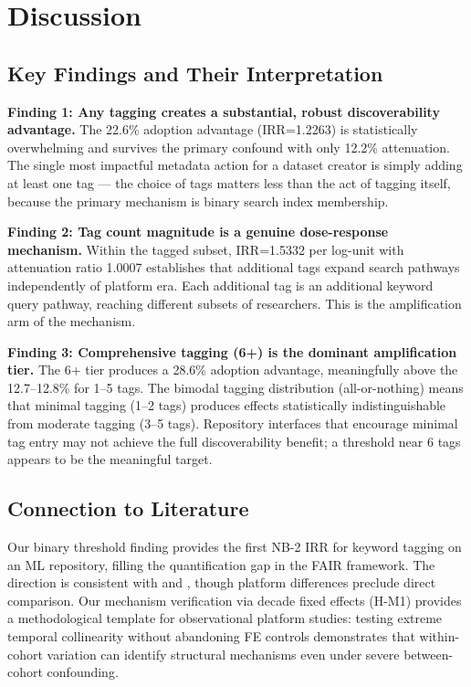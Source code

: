 \section{Discussion}
\label{sec:discussion}

\subsection{Key Findings and Their Interpretation}

\textbf{Finding 1: Any tagging creates a substantial, robust discoverability advantage.} The 22.6\% adoption advantage (IRR=1.2263) is statistically overwhelming and survives the primary confound with only 12.2\% attenuation. The single most impactful metadata action for a dataset creator is simply adding at least one tag --- the choice of tags matters less than the act of tagging itself, because the primary mechanism is binary search index membership.

\textbf{Finding 2: Tag count magnitude is a genuine dose-response mechanism.} Within the tagged subset, IRR=1.5332 per log-unit with attenuation ratio 1.0007 establishes that additional tags expand search pathways independently of platform era. Each additional tag is an additional keyword query pathway, reaching different subsets of researchers. This is the amplification arm of the mechanism.

\textbf{Finding 3: Comprehensive tagging (6+) is the dominant amplification tier.} The 6+ tier produces a 28.6\% adoption advantage, meaningfully above the 12.7--12.8\% for 1--5 tags. The bimodal tagging distribution (all-or-nothing) means that minimal tagging (1--2 tags) produces effects statistically indistinguishable from moderate tagging (3--5 tags). Repository interfaces that encourage minimal tag entry may not achieve the full discoverability benefit; a threshold near 6 tags appears to be the meaningful target.

\subsection{Connection to Literature}

Our binary threshold finding provides the first NB-2 IRR for keyword tagging on an ML repository, filling the quantification gap in the \citet{Wilkinson2016FAIR} FAIR framework. The direction is consistent with \citet{Yang2024Navigating} and \citet{Lachmuth2025BonaRes}, though platform differences preclude direct comparison. Our mechanism verification via decade fixed effects (H-M1) provides a methodological template for observational platform studies: testing extreme temporal collinearity without abandoning FE controls demonstrates that within-cohort variation can identify structural mechanisms even under severe between-cohort confounding.

